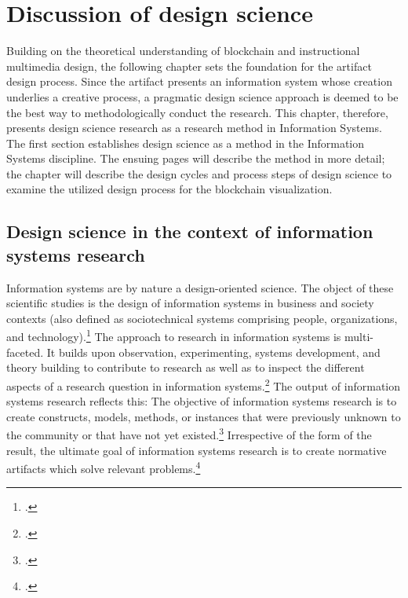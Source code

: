 \chapter{Discussion of design science}

Building on the theoretical understanding of blockchain and instructional multimedia design, the following chapter sets the foundation for the artifact design process. Since the artifact presents an information system whose creation underlies a creative process, a pragmatic design science approach is deemed to be the best way to methodologically conduct the research. This chapter, therefore, presents design science research as a research method in Information Systems. The first section establishes design science as a method in the Information Systems discipline. The ensuing pages will describe the method in more detail; the chapter will describe the design cycles and process steps of design science to examine the utilized design process for the blockchain visualization.

\section{Design science in the context of information systems research} \label{DesignScienceInISR}

Information systems are by nature a design-oriented science. The object of these scientific studies is the design of information systems in business and society contexts (also defined as sociotechnical systems comprising people, organizations, and technology).\footcites[Cf.][p.671]{OsterleMemorandumzurgestaltungsorientierten2010}[cf.][p.98]{HevnerDesignScienceResearch2004}[cf.][p.11]{OsterleGestaltungsorientierteWirtschaftsinformatikPladoyer2010}[cf.][p.252]{MarchDesignnaturalscience1995}
The approach to research in information systems is multi-faceted. It builds upon observation, experimenting, systems development, and theory building to contribute to research as well as to inspect the different aspects of a research question in information systems.\footcite[Cf.][p.86]{NunamakerSystemsdevelopmentInformation1991} The output of information systems research reflects this: The objective of information systems research is to create constructs, models, methods, or instances that were previously unknown to the community or that have not yet existed.\footcites[Cf.][p.12]{OsterleGestaltungsorientierteWirtschaftsinformatikPladoyer2010}[cf.][p.130]{ThomasBekannteundweniger2014} 
Irrespective of the form of the result, the ultimate goal of information systems research is to create normative artifacts which solve relevant problems.\footcite[Cf.][p.130]{ThomasBekannteundweniger2014}

